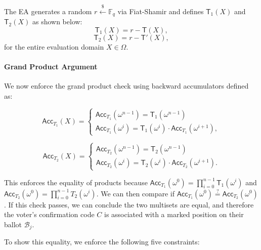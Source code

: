 The EA generates a random $r \stackrel{\$}{\leftarrow} \mathbb{F}_q$ via Fiat-Shamir and defines $\mathsf{T}_1(X)$ and $\mathsf{T}_2(X)$ as shown below:
\begin{equation}
\label{eq:t1}
\mathsf{T}_1(X)= r-\mathsf{T}(X),
\end{equation}
\begin{equation}
\label{eq:t2}
\mathsf{T}_2(X)= r-\mathsf{T}'(X),
\end{equation}
for the entire evaluation domain $X\in\Omega$.

\paragraph{Grand Product Argument}\mbox{}\newline
We now enforce the grand product check using backward accumulators defined as:

\begin{equation}
  \label{eq:acct1}
\mathsf{Acc}_{T_1}(X) =
    \begin{cases}
    \mathsf{Acc}_{T_1}(\omega^{n-1})=  \mathsf{T}_1(\omega^{n-1}) \\
    \mathsf{Acc}_{T_1}(\omega^i) =  \mathsf{T}_1(\omega^i)\cdot \mathsf{Acc}_{T_1}(\omega^{i+1}),
    \end{cases}
\end{equation}

\begin{equation}
  \label{eq:acct2}
\mathsf{Acc}_{T_2}(X) =
    \begin{cases}
    \mathsf{Acc}_{T_2}(\omega^{n-1})=  \mathsf{T}_2(\omega^{n-1}) \\
    \mathsf{Acc}_{T_2}(\omega^i) =  \mathsf{T}_2(\omega^i)\cdot \mathsf{Acc}_{T_2}(\omega^{i+1}).
    \end{cases}
\end{equation}

This enforces the equality of products because $\mathsf{Acc}_{T_1}(\omega^0) = \prod_{i=0}^{n-1} \mathsf{T}_1(\omega^i)$ and
$\mathsf{Acc}_{T_2}(\omega^0) = \prod_{i=0}^{n-1} T_2(\omega^i)$. 
We can then compare if $\mathsf{Acc}_{T_1}(\omega^0) \stackrel{?}{=} \mathsf{Acc}_{T_2}(\omega^0)$.
If this check passes, we can conclude the two multisets are equal, and therefore the voter's confirmation code $C$ is associated with a marked position on their ballot $\mathcal{B}_j$.


To show this equality, we enforce the following five constraints:



